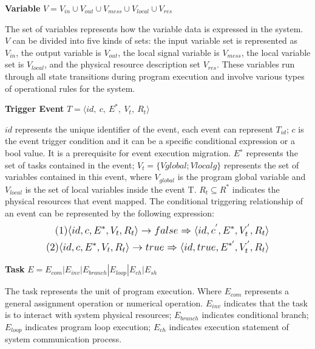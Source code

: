 \begin{definition} \textbf{Variable} $V = V_{in} \cup V_{out} \cup V_{mess} \cup V_{local} \cup V_{res}$
\end{definition}
The set of variables represents how the variable data is expressed in the system. $V$ can be divided into five kinds of sets: the input variable set is represented as $V_{in}$, the output variable is $V_{out}$, the local signal variable is $V_{mess}$, the local variable set is $V_{local}$, and the physical resource description set $V_{res}$. These variables run through all state transitions during program execution and involve various types of operational rules for the system.

\begin{definition} \textbf{Trigger Event} $T = \langle id, \ c, \ E^{*}, \ V_t, \ R_t \rangle$
\end{definition}
$id$ represents the unique identifier of the event, each event can represent $T_{id}$;
$c$ is the event trigger condition and it can be a specific conditional expression or a bool value. It is a prerequisite for event execution migration.
$E^{∗}$ represents the set of tasks contained in the event;
$V_t = \{Vglobal; Vlocalg\}$ represents the set of variables contained in this event, where $V_{global}$ is the program global variable and $V_{local}$ is the set of local variables inside the event T.
$R_t \subseteq R^{*}$ indicates the physical resources that event mapped. The conditional triggering relationship of an event can be represented by the following expression:
    \begin{equation*}
        \normalsize
        \begin{aligned}
            (1)\langle id, c, E^{*}, V_t, R_t \rangle \rightarrow false \Rightarrow \langle id, c^{'}, E^{*},V_{t}^{'},R_t \rangle \\
            (2)\langle id, c, E^{*}, V_t, R_t \rangle \rightarrow true \Rightarrow \langle id, true, E^{*'},V_{t}^{'}, R_t \rangle
        \end{aligned}
    \end{equation*}


\begin{definition} \textbf{Task} $E = E_{com} | E_{inv} | E_{branch} | E_{loop} | E_{ch} | E_{sh}$
\end{definition}
The task represents the unit of program execution. Where $E_{com}$ represents a general assignment operation or numerical operation. $E_{inv}$ indicates that the task is to interact with system physical resources; $E_{branch}$ indicates conditional branch; $E_{loop}$ indicates program loop execution; $E_{ch}$ indicates execution statement of system communication process.



